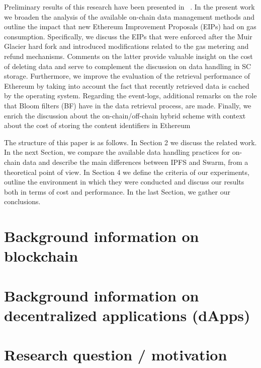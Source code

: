 Preliminary results of this research have been presented in  ~\citep{kostamis_2021}.
In the present work we broaden the analysis of the available on-chain data management methods and outline the impact that new Ethereum Improvement Proposals (EIPs) had on gas consumption. Specifically, we discuss the EIPs that were enforced after the Muir Glacier hard fork and introduced modifications related to the gas metering and refund mechanisms. Comments on the latter provide valuable insight on the cost of deleting data and serve to complement the discussion on data handling in SC storage.
Furthermore, we improve the evaluation of the retrieval performance 
of Ethereum by taking into account the fact that
recently retrieved data is cached by the operating system. Regarding the event-logs, additional remarks on the role that Bloom filters (BF) have in the data retrieval process, are made.
Finally, we enrich the discussion about the on-chain/off-chain
hybrid scheme with context about the cost of storing
the content identifiers in Ethereum



The structure of this paper is as follows. In Section 2 we discuss the related work. In the next Section, we compare the available data handling practices for on-chain data and describe the main differences between IPFS and Swarm, from a theoretical point of view. In Section 4 we define the criteria of our experiments, outline the environment in which they were conducted and discuss our results both in terms of cost and performance. In the last Section, we gather our conclusions. 

\section{Background information on blockchain}\label{sec:}
\section{Background information on decentralized applications (dApps)}\label{sec:}
\section{Research question / motivation}\label{sec:}
